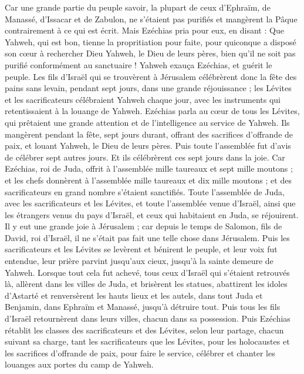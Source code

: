 \begin{multicols}{2}
Car une grande partie du peuple savoir, la plupart de ceux d'Ephraïm, de Manassé, d'Issacar et de Zabulon, ne s'étaient pas purifiés et mangèrent la Pâque contrairement à ce qui est écrit. Mais Ezéchias pria pour eux, en disant : Que Yahweh, qui est bon, tienne la propritiation pour faite,
pour quiconque a disposé son cœur à rechercher Dieu Yahweh, le Dieu de leurs pères, bien qu'il ne soit pas purifié conformément au sanctuaire !
Yahweh exauça Ezéchias, et guérit le peuple.
Les fils d'Israël qui se trouvèrent à Jérusalem célébrèrent donc la fête des pains sans levain, pendant sept jours, dans une grande réjouissance ; les Lévites et les sacrificateurs célébraient Yahweh chaque jour, avec les instruments qui retentissaient à la louange de Yahweh.
Ezéchias parla au cœur de tous les Lévites, qui prêtaient une grande attention et de l'intelligence au service de Yahweh. Ils mangèrent pendant la fête, sept jours durant, offrant des sacrifices d'offrande de paix, et louant Yahweh, le Dieu de leurs pères.
Puis toute l'assemblée fut d'avis de célébrer sept autres jours. Et ils célébrèrent ces sept jours dans la joie.
Car Ezéchias, roi de Juda, offrit à l'assemblée mille taureaux et sept mille moutons ; et les chefs donnèrent à l'assemblée mille taureaux et dix mille moutons ; et des sacrificateurs en grand nombre s'étaient sanctifiés.
Toute l'assemblée de Juda, avec les sacrificateurs et les Lévites, et toute l'assemblée venue d'Israël, ainsi que les étrangers venus du pays d'Israël, et ceux qui habitaient en Juda, se réjouirent.
Il y eut une grande joie à Jérusalem ; car depuis le temps de Salomon, fils de David, roi d'Israël, il ne s'était pas fait une telle chose dans Jérusalem.
Puis les sacrificateurs et les Lévites se levèrent et bénirent le peuple, et leur voix fut entendue, leur prière parvint jusqu'aux cieux, jusqu'à la sainte demeure de Yahweh.
\VerseOne{}Lorsque tout cela fut achevé, tous ceux d'Israël qui s'étaient retrouvés là, allèrent dans les villes de Juda, et brisèrent les statues, abattirent les idoles d'Astarté et renversèrent les hauts lieux et les autels, dans tout Juda et Benjamin, dans Ephraïm et Manassé, jusqu'à détruire tout. Puis tous les fils d'Israël retournèrent dans leurs villes, chacun dans sa possession.
Puis Ezéchias rétablit les classes des sacrificateurs et des Lévites, selon leur partage, chacun suivant sa charge, tant les sacrificateurs que les Lévites, pour les holocaustes et les sacrifices d'offrande de paix, pour faire le service, célébrer et chanter les louanges aux portes du camp de Yahweh.

\end{multicols}
